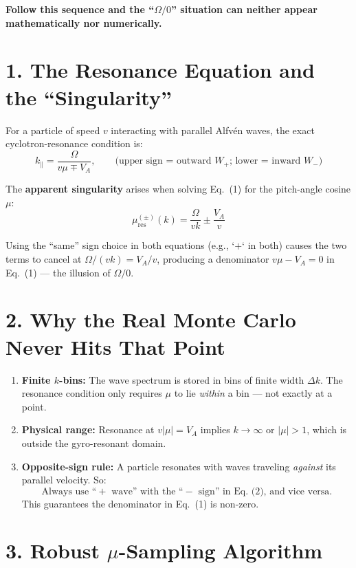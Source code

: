 \noindent
\textbf{Follow this sequence and the ``$\Omega/0$'' situation can neither appear mathematically nor numerically.}

\section*{1. The Resonance Equation and the ``Singularity''}

For a particle of speed $v$ interacting with parallel Alfvén waves, the exact cyclotron-resonance condition is:
\begin{equation}
k_\parallel = \frac{\Omega}{v\mu \mp V_A}, \qquad 
\text{(upper sign = outward $W_+$; lower = inward $W_-$)} 
\tag{1}
\end{equation}

The \textbf{apparent singularity} arises when solving Eq.~(1) for the pitch-angle cosine $\mu$:
\begin{equation}
\mu_{\text{res}}^{(\pm)}(k) = \frac{\Omega}{v k} \pm \frac{V_A}{v}
\tag{2}
\end{equation}

Using the ``same'' sign choice in both equations (e.g., `$+$` in both) causes the two terms to cancel at $\Omega / (v k) = V_A / v$, producing a denominator $v\mu - V_A = 0$ in Eq.~(1) — the illusion of $\Omega / 0$.

\section*{2. Why the Real Monte Carlo Never Hits That Point}

\begin{enumerate}
    \item \textbf{Finite $k$-bins:} The wave spectrum is stored in bins of finite width $\Delta k$. The resonance condition only requires $\mu$ to lie \textit{within} a bin — not exactly at a point.
    \item \textbf{Physical range:} Resonance at $v|\mu| = V_A$ implies $k \rightarrow \infty$ or $|\mu| > 1$, which is outside the gyro-resonant domain.
    \item \textbf{Opposite-sign rule:} A particle resonates with waves traveling \textit{against} its parallel velocity. So:
    \[
    \text{Always use ``$+$ wave'' with the ``$-$ sign'' in Eq.~(2), and vice versa.}
    \]
    This guarantees the denominator in Eq.~(1) is non-zero.
\end{enumerate}

\section*{3. Robust $\mu$-Sampling Algorithm}


